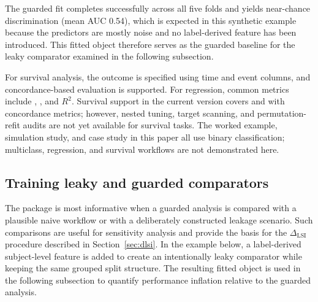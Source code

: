 \documentclass[article,shortnames]{jss}
\begin{document}
\noindent
The guarded fit completes successfully across all five folds and yields near-chance discrimination (mean AUC 0.54), which is expected in this synthetic example because the predictors are mostly noise and no label-derived feature has been introduced. This fitted object therefore serves as the guarded baseline for the leaky comparator examined in the following subsection.

For survival analysis, the outcome is specified using time and event columns, and concordance-based evaluation is supported. For regression, common metrics include , , and $R^2$. Survival support in the current version covers  and  with concordance metrics; however, nested tuning, target scanning, and permutation-refit audits are not yet available for survival tasks. The worked example, simulation study, and case study in this paper all use binary classification; multiclass, regression, and survival workflows are not demonstrated here.

\subsection{Training leaky and guarded comparators}

The package is most informative when a guarded analysis is compared with a plausible naive workflow or with a deliberately constructed leakage scenario. Such comparisons are useful for sensitivity analysis and provide the basis for the $\Delta_{\mathrm{LSI}}$ procedure described in Section~\ref{sec:dlsi}. In the example below, a label-derived subject-level feature is added to create an intentionally leaky comparator while keeping the same grouped split structure. The resulting fitted object is used in the following subsection to quantify performance inflation relative to the guarded analysis.
\end{document}
